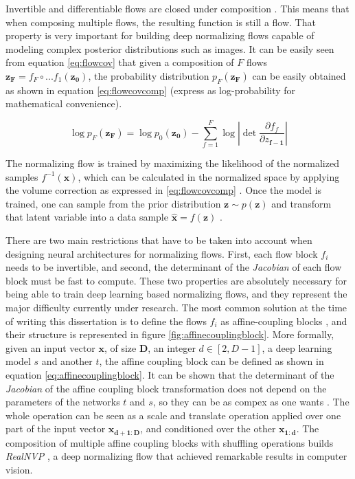Invertible and differentiable flows are closed under composition \autocite{kobyzev}. This means that when composing multiple flows, the resulting function is still a flow. That property is very important for building deep normalizing flows capable of modeling complex posterior distributions such as images. It can be easily seen from equation \ref{eq:flowcov}  \autocite{rezende2015} that given a composition of $F$ flows $\mathbf{z_F}=f_F \circ ... f_1(\mathbf{z_0})$, the probability distribution $p_F(\mathbf{z_F})$ can be easily obtained as shown in equation \ref{eq:flowcovcomp} (express as log-probability for mathematical convenience).

\begin{equation}
\label{eq:flowcovcomp}
\log p_F(\mathbf{z_F}) = \log p_0(\mathbf{z_0}) - \sum_{f=1}^{F} \log  \left| \det \frac{\partial f_f}{\partial z_{\mathbf{f-1}}} \right|
\end{equation}


The normalizing flow is trained by maximizing the likelihood of the normalized samples $f^{-1}(\mathbf{x})$, which can be calculated in the normalized space by applying the volume correction as expressed in \ref{eq:flowcovcomp} \autocite{papamakarios2017}. Once the model is trained, one can sample from the prior distribution $\mathbf{z} \sim p(\mathbf{z})$ and transform that latent variable into a data sample $\hat{\mathbf{x}} = f(\mathbf{z})$ \autocite{rezende2015}.

There are two main restrictions that have to be taken into account when designing neural architectures for normalizing flows. First, each flow block $f_i$ needs to be invertible, and second, the determinant of the \textit{Jacobian} of each flow block must be fast to compute. These two properties are absolutely necessary for being able to train deep learning based normalizing flows, and they represent the major difficulty currently under research. The most common solution at the time of writing this dissertation is to define the flows $f_i$ as affine-coupling blocks \autocite{dinh2018}, and their structure is represented in figure \ref{fig:affinecouplingblock}. More formally, given an input vector $\mathbf{x}$, of size $\mathbf{D}$, an integer $d \in [2,D-1]$, a deep learning model $s$ and another $t$, the affine coupling block can be defined as shown in equation \ref{eq:affinecouplingblock}. It can be shown that the determinant of the \textit{Jacobian} of the affine coupling block transformation does not depend on the parameters of the networks $t$ and $s$, so they can be as compex as one wants \autocite{dinh2018}. The whole operation can be seen as a scale and translate operation applied over one part of the input vector $\mathbf{x_{d+1:D}}$, and conditioned over the other $\mathbf{x_{1:d}}$. The composition of multiple affine coupling blocks with shuffling operations builds \textit{RealNVP} \autocite{dinh2018}, a deep normalizing flow that achieved remarkable results in computer vision.

